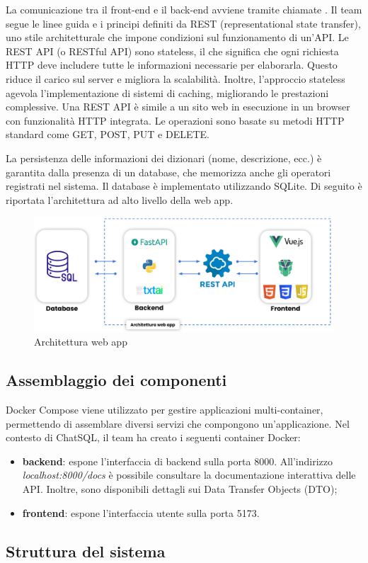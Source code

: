 \vspace{0.5\baselineskip}
\par La comunicazione tra il front-end e il back-end avviene tramite chiamate . Il team segue le linee guida e i principi definiti da REST (representational state transfer), uno stile architetturale che impone condizioni sul funzionamento di un'API. Le REST API (o RESTful API) sono stateless, il che significa che ogni richiesta HTTP deve includere tutte le informazioni necessarie per elaborarla. Questo riduce il carico sul server e migliora la scalabilità. Inoltre, l’approccio stateless agevola l'implementazione di sistemi di caching, migliorando le prestazioni complessive. Una REST API è simile a un sito web in esecuzione in un browser con funzionalità HTTP integrata. Le operazioni sono basate su metodi HTTP standard come GET, POST, PUT e DELETE.

\vspace{0.5\baselineskip}
\par La persistenza delle informazioni dei dizionari (nome, descrizione, ecc.) è garantita dalla presenza di un database, che memorizza anche gli operatori registrati nel sistema. Il database è implementato utilizzando SQLite. Di seguito è riportata l'architettura ad alto livello della web app.

\begin{figure}[H]
  \centering
  \includegraphics[width=\textwidth]{assets/architettura_web_app.pdf}
  \caption{Architettura web app}
\end{figure}

\subsection{Assemblaggio dei componenti}
\par Docker Compose viene utilizzato per gestire applicazioni multi-container, permettendo di assemblare diversi servizi che compongono un'applicazione. Nel contesto di ChatSQL, il team ha creato i seguenti container Docker:
\begin{itemize}
  \item \textbf{backend}: espone l'interfaccia di backend sulla porta 8000. All'indirizzo \textit{localhost:8000/docs} è possibile consultare la documentazione interattiva delle API. Inoltre, sono disponibili dettagli sui Data Transfer Objects (DTO);
  \item \textbf{frontend}: espone l'interfaccia utente sulla porta 5173.
\end{itemize}

\subsection{Struttura del sistema}





